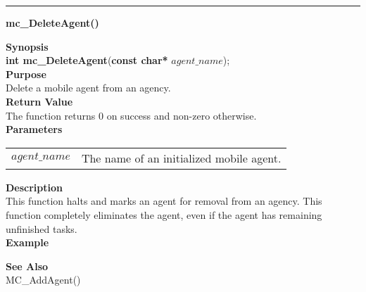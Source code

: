 \noindent
\vspace{5pt}
\rule{6.5in}{0.015in}
\noindent
{}
{\LARGE \bf mc\_DeleteAgent()}\\
\label{api:mc_DeleteAgent()}

\noindent
{\bf Synopsis}\\
{\bf int mc\_DeleteAgent}({\bf const char*} $agent\_name$);\\

\noindent
{\bf Purpose}\\
Delete a mobile agent from an agency.\\

\noindent
{\bf Return Value}\\
The function returns 0 on success and non-zero otherwise.\\

\noindent
{\bf Parameters}
\vspace{-0.1in}
\begin{description}
\item
\begin{tabular}{p{20 mm}p{145 mm}} 
$agent\_name$ & The name of an initialized mobile agent.
\end{tabular}
\end{description}

\noindent
{\bf Description}\\
This function halts and marks an agent for removal from an agency. This 
function completely eliminates the agent, even if the agent has remaining
unfinished tasks. \\

\noindent
{\bf Example}\\
\noindent

\noindent
{\bf See Also}\\
MC\_AddAgent()

